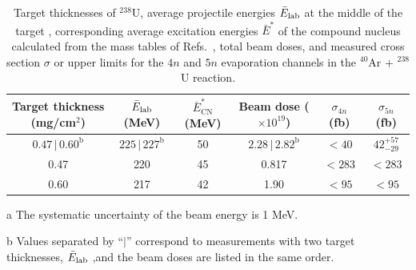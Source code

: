 \documentclass[final,5p,times,twocolumn,number,sort&compress]{elsarticle}
\begin{document}
\begin{table}[htbp]
\centering
\captionsetup{font=small}
\caption{Target thicknesses of $^{238}$U, average projectile energies $\bar{E}_{\rm lab}$ at the middle of the target , corresponding average excitation energies $\bar{E}^{*}$ of the compound nucleus calculated from the mass tables of Refs.~\cite{myers1996NuclearPropertiesAccording,wang2021NUBASE2020EvaluationNuclear}, total beam doses, and measured cross section $\sigma$ or upper limits for the $4n$ and $5n$ evaporation channels in the $^{40}$Ar + $^{238}$U reaction. }
\label{tab:cross_sections}
\begin{threeparttable}
\setlength{\tabcolsep}{3.5pt}
\renewcommand{\arraystretch}{1.08}
\small
\begin{tabular*}{\columnwidth}{@{\extracolsep{\fill}}cccccc@{}}
\toprule
\makecell[c]{Target thickness\\(mg/cm$^{2}$)} &
\makecell[c]{$\bar{E}_{\rm lab}$\tnote{a}\\(MeV)} &
\makecell[c]{$\bar{E}^{*}_{\mathrm{CN}}$\\(MeV)} &
\makecell[c]{Beam dose\\($\times 10^{19}$)} &
\makecell[c]{$\sigma_{4n}$\\(fb)} &
\makecell[c]{$\sigma_{5n}$\\(fb)} \\
\midrule
$0.47\,|\,0.60^{\text{b}}$ & $225\,|\,227^{\text{b}}$ & 50 & $2.28\,|\,2.82^{\text{b}}$ & $<40$ & $42^{+57}_{-29}$ \\
0.47 & 220 & 45 & 0.817 & $<283$ & $<283$ \\
0.60 & 217 & 42 & 1.90 & $<95$ & $<95$ \\
\bottomrule
\end{tabular*}
\begin{tablenotes}[flushleft]
\footnotesize
\item[a] The systematic uncertainty of the beam energy is 1 MeV.
\item[b] Values separated by ``$|$'' correspond to measurements with two target thicknesses, $\bar{E}_{\rm lab}$ ,and the beam doses are listed in the same order.
\end{tablenotes}
\end{threeparttable}
\end{table}
\end{document}
